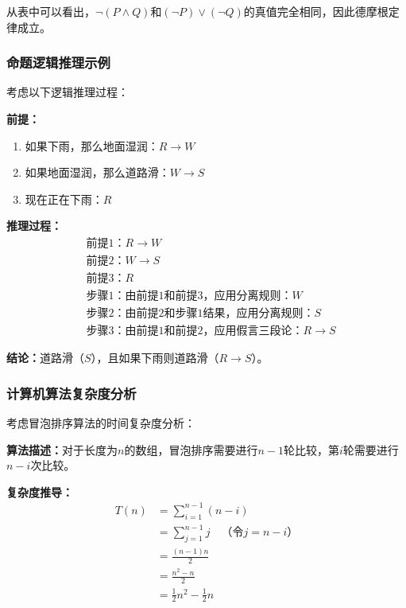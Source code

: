 \documentclass{article}
\begin{document}
从表中可以看出，$\neg(P \land Q)$和$(\neg P) \lor (\neg Q)$的真值完全相同，因此德摩根定律成立。

\subsubsection{命题逻辑推理示例}

考虑以下逻辑推理过程：

\textbf{前提：}
\begin{enumerate}
      \item 如果下雨，那么地面湿润：$R \rightarrow W$
      \item 如果地面湿润，那么道路滑：$W \rightarrow S$
      \item 现在正在下雨：$R$
\end{enumerate}

\textbf{推理过程：}
\begin{align}
       & \text{前提1：} R \rightarrow W                  \\
       & \text{前提2：} W \rightarrow S                  \\
       & \text{前提3：} R                                \\
       & \text{步骤1：由前提1和前提3，应用分离规则：} W                \\
       & \text{步骤2：由前提2和步骤1结果，应用分离规则：} S              \\
       & \text{步骤3：由前提1和前提2，应用假言三段论：} R \rightarrow S
\end{align}

\textbf{结论：}道路滑（$S$），且如果下雨则道路滑（$R \rightarrow S$）。

\subsubsection{计算机算法复杂度分析}

考虑冒泡排序算法的时间复杂度分析：

\textbf{算法描述：}对于长度为$n$的数组，冒泡排序需要进行$n-1$轮比较，第$i$轮需要进行$n-i$次比较。

\textbf{复杂度推导：}
\begin{align}
      T(n) & = \sum_{i=1}^{n-1} (n-i)                       \\
           & = \sum_{j=1}^{n-1} j \quad \text{（令$j = n-i$）} \\
           & = \frac{(n-1)n}{2}                             \\
           & = \frac{n^2 - n}{2}                            \\
           & = \frac{1}{2}n^2 - \frac{1}{2}n
\end{align}
\end{document}
